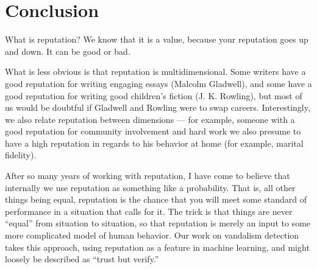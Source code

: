 \section{Conclusion}

What is reputation?  We know that it is a value, because your reputation goes
up and down. It can be good or bad.

What is less obvious is that reputation is multidimensional.  Some writers have
a good reputation for writing engaging essays (\eg Malcolm Gladwell), and some
have a good reputation for writing good children's fiction (\eg J. K. Rowling),
but most of us would be doubtful if Gladwell and Rowling were to swap careers.
Interestingly, we also relate reputation between
dimensions --- for example, someone
with a good reputation for community involvement and hard work we also presume
to have a high reputation in regards to his behavior at home (for example,
marital fidelity).

After so many years of working with reputation, I have come to believe that
internally we use reputation as something like a probability. That is, all
other things being equal, reputation is the chance that you will meet some
standard of performance in a situation that calls for it.  The trick is that
things are never ``equal'' from situation to situation, so that reputation is
merely an input to some more complicated model of human behavior.  Our work on
vandalism detection takes this approach, using reputation as a feature in
machine learning, and might loosely be described as ``trust but verify.''

